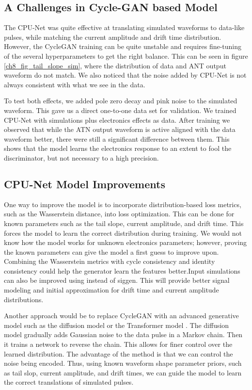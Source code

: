\subsection{ A Challenges in Cycle-GAN based Model}
The CPU-Net was quite effective at translating simulated waveforms to data-like pulses, while matching the current amplitude and drift time distribution. However, the CycleGAN training can be quite unstable and requires fine-tuning of the several hyperparameters to get the right balance. This can be seen in figure \ref{ch8_fig_tail_slope_sim}, where the distribution of data and ANT output waveform do not match. We also noticed that the noise added by CPU-Net is not always consistent with what we see in the data. 

To test both effects, we added pole zero decay and pink noise to the simulated waveform. This gave us a direct one-to-one data set for validation. We trained CPU-Net with simulations plus electronics effects as data. After training we observed that while the ATN output waveform is active aligned with the data waveform better, there were still a significant difference between them. This shows that the model learns the electronics response to an extent to fool the discriminator, but not necessary to a high precision. 

\subsection{CPU-Net Model Improvements}
One way to improve the model is to incorporate distribution-based loss metrics, such as the Wasserstein distance, into loss optimization. This can be done for known parameters such as the tail slope, current amplitude, and drift time. This forces the model to learn the correct distribution during training. We would not know how the model works for unknown electronics parameters; however, proving the known parameters can give the model a first guess to improve upon. Combining the Wasserstein metrics with cycle consistency and identity consistency could help the generator learn the features better.Input simulations can also be improved using {\ssd} instead of siggen. This will provide better signal modeling and initial approximation for drift time and current amplitude distributions.

Another approach would be to replace CycleGAN with an advanced generative model such as the diffusion model \cite{2020arXiv200611239H} or the Transformer model \cite{Transformer}. The diffusion model gradually adds Gaussian noise to the data pulse in a Markov chain. Then it trains a network to reverse the chain. This allows for finer control over the learned distribution. The advantage of the method is that we can control the noise being encoded. Thus, using known waveform shape parameter priors, such as tail slop, current amplitude, and drift times, we can guide the model to learn the correct translations of simulated pulses.